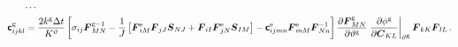 \documentclass[10pt,letterpaper,oneside]{report}
\newcommand{\ten}[1]{\mbox{\boldmath $#1$}{}}
\newcommand{\tenf}[1]{\mbox{{\sffamily{\bfseries {#1}}}}}
\newcommand{\scas}[1]{\mbox{{\scriptsize{${\rm{#1}}$}}}{}}
\begin{document}
\begin{itemize}
\begin{align}
\cdots{}& \notag \\
\tenf{c}^{\scas{g}}_{ijkl} 
={}& \frac{2 k^{\scas{g}} \Delta t}{K^\vartheta}  \left[ \sigma_{ij} \ten{F}^{\scas{g}-1}_{MN} - \frac{1}{J} \left[ \ten{F}^{\scas{e}}_{iM} \ten{F}_{jJ} \ten{S}_{NJ} + \ten{F}_{iI} \ten{F}^{\scas{e}}_{jN} \ten{S}_{IM} \right]
- \tenf{c}^{\scas{e}}_{ijmn} \ten{F}^{\scas{e}}_{mM} \ten{F}^{-1}_{Nn} \right] \frac{\partial \ten{F}^{\scas{g}}_{MN}}{\partial \vartheta^{\scas{g}}} \left. \frac{\partial \phi^{\scas{g}} }{\partial \ten{C}_{KL}} \right|_{\vartheta^{\scas{g}}} \ten{F}_{kK} \ten{F}_{lL} \, . 
\end{align}



\end{itemize}
\end{document}
